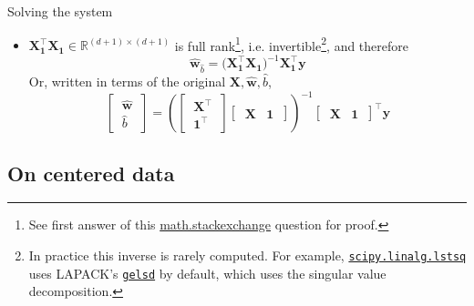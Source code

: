 \documentclass{beamer}
\numberwithin{equation}{section}
\newcommand{\ahref}[2]{\href{#1}{\alert{#2}}}
\begin{document}
\begin{frame}{Solving the system}
\begin{itemize}
        \item
        $ \mathbf{X}_\mathbf{1}^\top\mathbf{X}_\mathbf{1} \in
        \mathbb{R}^{(d + 1) \times (d + 1)} $ is full rank\footnote{
            See first answer of this \ahref{%
                https://math.stackexchange.com/questions/349738/prove-%
                operatornamerankata-operatornameranka-for-any-a-in-m-m-times-n%
            }{math.stackexchange} question for proof.
        }, i.e. invertible\footnote{
            In practice this inverse is rarely computed. For example,
            \ahref{%
                https://docs.scipy.org/doc/scipy/reference/generated/%
                scipy.linalg.lstsq.html%
            }{\texttt{scipy.linalg.lstsq}} uses LAPACK's \ahref{%
                http://www.netlib.org/lapack/explore-html/db/d6a/%
                dgelsd_8f.html%
            }{\texttt{gelsd}} by default, which uses the singular value
            decomposition.
        },
        and therefore
        \begin{equation} \label{lr_ols_aug}
            \hat{\mathbf{w}}_{\hat{b}} = \big(
                \mathbf{X}_\mathbf{1}^\top\mathbf{X}_\mathbf{1}
            \big)^{-1}\mathbf{X}_\mathbf{1}^\top\mathbf{y}
        \end{equation}
        Or, written in terms of the original $ \mathbf{X}, \hat{\mathbf{w}},
        \hat{b} $,
        \begin{equation} \label{lr_ols_block}
            \begin{bmatrix}
                \ \hat{\mathbf{w}} \ \\ \ \hat{b} \
            \end{bmatrix} =
            \left(
                \begin{bmatrix}
                    \ \mathbf{X}^\top \ \\ \ \mathbf{1}^\top \
                \end{bmatrix}
                \begin{bmatrix}
                    \ \mathbf{X} & \mathbf{1} \
                \end{bmatrix}
            \right)^{-1}
            \begin{bmatrix}
                \ \mathbf{X} & \mathbf{1} \
            \end{bmatrix}^\top\mathbf{y}
        \end{equation}
    \end{itemize}
\end{frame}

\subsection{On centered data}
\end{document}
